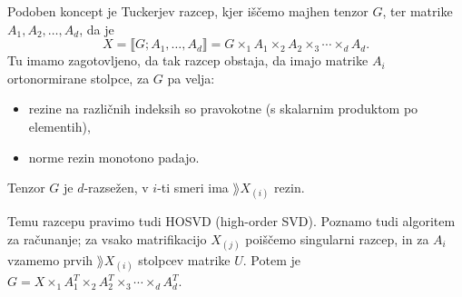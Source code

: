 Podoben koncept je Tuckerjev razcep, kjer iščemo majhen tenzor $G$, ter matrike
$A_1, A_2, \ldots, A_d$, da je
\[
  X = \llbracket G; A_1, \ldots, A_d \rrbracket
  = G \times_1 A_1 \times_2 A_2 \times_3 \cdots \times_d A_d.
\]
Tu imamo zagotovljeno, da tak razcep obstaja, da imajo matrike $A_i$
ortonormirane stolpce, za $G$ pa velja:
\begin{itemize}
\item rezine na različnih indeksih so pravokotne (s skalarnim produktom po
  elementih),
\item norme rezin monotono padajo.
\end{itemize}
Tenzor $G$ je $d$-razsežen, v $i$-ti smeri ima $\rang X_{(i)}$ rezin.

Temu razcepu pravimo tudi HOSVD (high-order SVD).
Poznamo tudi algoritem za računanje; za vsako matrifikacijo $X_{(j)}$ poiščemo
singularni razcep, in za $A_i$ vzamemo prvih $\rang X_{(i)}$ stolpcev matrike
$U$.
Potem je $G = X \times_1 A_1^T \times_2 A_2^T \times_3 \cdots \times_d A_d^T$.


